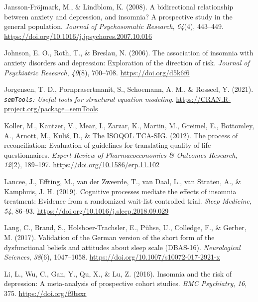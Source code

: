 \documentclass[
  ,doc,11pt, twoside,floatsintext]{apa6}
\newlength{\cslhangindent}
\newlength{\cslentryspacingunit} %
\newenvironment{CSLReferences}[2] %
 {%
  \setlength{\parindent}{0pt}
  \ifodd #1
  \let\oldpar\par
  \def\par{\hangindent=\cslhangindent\oldpar}
  \fi
  \setlength{\parskip}{#2\cslentryspacingunit}
 }%
 {}
\begin{document}
\begin{CSLReferences}{1}{0}
\leavevmode{}%
Jansson-Fröjmark, M., \& Lindblom, K. (2008). A bidirectional relationship between anxiety and depression, and insomnia? {A} prospective study in the general population. \emph{Journal of Psychosomatic Research}, \emph{64}(4), 443--449. \url{https://doi.org/10.1016/j.jpsychores.2007.10.016}

\leavevmode{}%
Johnson, E. O., Roth, T., \& Breslau, N. (2006). The association of insomnia with anxiety disorders and depression: Exploration of the direction of risk. \emph{Journal of Psychiatric Research}, \emph{40}(8), 700--708. \url{https://doi.org/d5k6f6}

\leavevmode{}%
Jorgensen, T. D., Pornprasertmanit, S., Schoemann, A. M., \& Rosseel, Y. (2021). \emph{\texttt{semTools}: {U}seful tools for structural equation modeling}. \url{https://CRAN.R-project.org/package=semTools}

\leavevmode{}%
Koller, M., Kantzer, V., Mear, I., Zarzar, K., Martin, M., Greimel, E., Bottomley, A., Arnott, M., Kuliś, D., \& The ISOQOL TCA-SIG. (2012). The process of reconciliation: Evaluation of guidelines for translating quality-of-life questionnaires. \emph{Expert Review of Pharmacoeconomics \& Outcomes Research}, \emph{12}(2), 189--197. \url{https://doi.org/10.1586/erp.11.102}

\leavevmode{}%
Lancee, J., Effting, M., van der Zweerde, T., van Daal, L., van Straten, A., \& Kamphuis, J. H. (2019). Cognitive processes mediate the effects of insomnia treatment: Evidence from a randomized wait-list controlled trial. \emph{Sleep Medicine}, \emph{54}, 86--93. \url{https://doi.org/10.1016/j.sleep.2018.09.029}

\leavevmode{}%
Lang, C., Brand, S., Holsboer-Trachsler, E., Pühse, U., Colledge, F., \& Gerber, M. (2017). Validation of the {German} version of the short form of the dysfunctional beliefs and attitudes about sleep scale ({DBAS-16}). \emph{Neurological Sciences}, \emph{38}(6), 1047--1058. \url{https://doi.org/10.1007/s10072-017-2921-x}

\leavevmode{}%
Li, L., Wu, C., Gan, Y., Qu, X., \& Lu, Z. (2016). Insomnia and the risk of depression: A meta-analysis of prospective cohort studies. \emph{BMC Psychiatry}, \emph{16}, 375. \url{https://doi.org/f9bsxr}


\end{CSLReferences}
\end{document}
